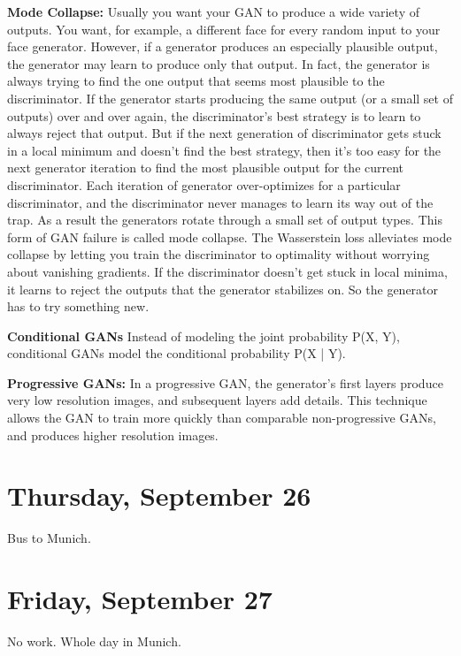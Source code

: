 \documentclass[11pt,letterpaper]{article}
\begin{document}
\textbf{Mode Collapse:}
Usually you want your GAN to produce a wide variety of outputs. You want, for example, a different face for every random input to your face generator. However, if a generator produces an especially plausible output, the generator may learn to produce only that output. In fact, the generator is always trying to find the one output that seems most plausible to the discriminator. If the generator starts producing the same output (or a small set of outputs) over and over again, the discriminator's best strategy is to learn to always reject that output. But if the next generation of discriminator gets stuck in a local minimum and doesn't find the best strategy, then it's too easy for the next generator iteration to find the most plausible output for the current discriminator. Each iteration of generator over-optimizes for a particular discriminator, and the discriminator never manages to learn its way out of the trap. As a result the generators rotate through a small set of output types. This form of GAN failure is called mode collapse. The Wasserstein loss alleviates mode collapse by letting you train the discriminator to optimality without worrying about vanishing gradients. If the discriminator doesn't get stuck in local minima, it learns to reject the outputs that the generator stabilizes on. So the generator has to try something new.

\textbf{Conditional GANs}
Instead of modeling the joint probability P(X, Y), conditional GANs model the conditional probability P(X | Y).

\textbf{Progressive GANs:}
In a progressive GAN, the generator's first layers produce very low resolution images, and subsequent layers add details. This technique allows the GAN to train more quickly than comparable non-progressive GANs, and produces higher resolution images.


\section*{Thursday, September 26}
Bus to Munich. 

\section*{Friday, September 27}
No work. Whole day in Munich.

\printbibliography
\end{document}
